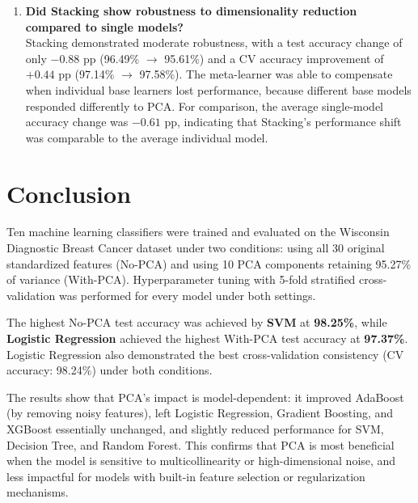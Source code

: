 \documentclass[12pt,a4paper]{article}
\begin{document}
\begin{enumerate}
    \item \textbf{Did Stacking show robustness to dimensionality reduction compared to single models?}\\
    Stacking demonstrated moderate robustness, with a test accuracy change of only $-0.88$ pp (96.49\% $\to$ 95.61\%) and a CV accuracy improvement of $+0.44$ pp (97.14\% $\to$ 97.58\%). The meta-learner was able to compensate when individual base learners lost performance, because different base models responded differently to PCA. For comparison, the average single-model accuracy change was $-0.61$ pp, indicating that Stacking's performance shift was comparable to the average individual model.
\end{enumerate}

\section{Conclusion}
Ten machine learning classifiers were trained and evaluated on the Wisconsin Diagnostic Breast Cancer dataset under two conditions: using all 30 original standardized features (No-PCA) and using 10 PCA components retaining 95.27\% of variance (With-PCA). Hyperparameter tuning with 5-fold stratified cross-validation was performed for every model under both settings.

The highest No-PCA test accuracy was achieved by \textbf{SVM} at \textbf{98.25\%}, while \textbf{Logistic Regression} achieved the highest With-PCA test accuracy at \textbf{97.37\%}. Logistic Regression also demonstrated the best cross-validation consistency (CV accuracy: 98.24\%) under both conditions.

The results show that PCA's impact is model-dependent: it improved AdaBoost (by removing noisy features), left Logistic Regression, Gradient Boosting, and XGBoost essentially unchanged, and slightly reduced performance for SVM, Decision Tree, and Random Forest. This confirms that PCA is most beneficial when the model is sensitive to multicollinearity or high-dimensional noise, and less impactful for models with built-in feature selection or regularization mechanisms.
\end{document}

